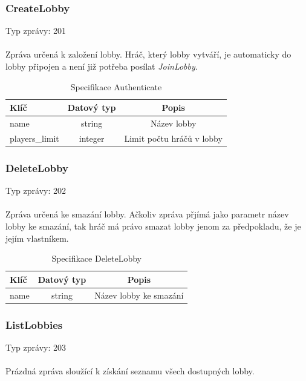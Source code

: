 \documentclass[12pt, a4paper]{article}
\begin{document}
    \subsubsection*{CreateLobby}
    Typ zprávy: 201\\\\
    Zpráva určená k založení lobby.
    Hráč, který lobby vytváří, je automaticky do lobby připojen a není již potřeba posílat \textit{JoinLobby}.

    \begin{table}[H]
        \centering
        \begin{tabular}{|l|c|c|}
            \hline
            Klíč & Datový typ & Popis\\
            \hline
            \hline
            name & string & Název lobby\\
            \hline
            players\_limit & integer & Limit počtu hráčů v lobby\\
            \hline
        \end{tabular}
        \caption{Specifikace Authenticate}
    \end{table}

    \subsubsection*{DeleteLobby}
    Typ zprávy: 202\\\\
    Zpráva určená ke smazání lobby.
    Ačkoliv zpráva přjímá jako parametr název lobby ke smazání, tak hráč má právo smazat lobby jenom za předpokladu, že je jejím vlastníkem.

    \begin{table}[H]
        \centering
        \begin{tabular}{|l|c|c|}
            \hline
            Klíč & Datový typ & Popis\\
            \hline
            \hline
            name & string & Název lobby ke smazání\\
            \hline
        \end{tabular}
        \caption{Specifikace DeleteLobby}
    \end{table}

    \subsubsection*{ListLobbies}
    Typ zprávy: 203\\\\
    Prázdná zpráva sloužící k získání seznamu všech dostupných lobby.
\end{document}
